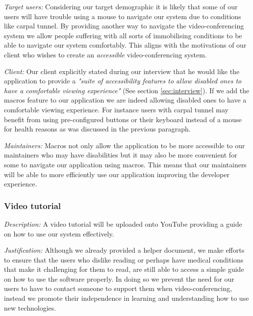 \textit{Target users:}
Considering our target demographic it is likely that
some of our users will have trouble using a mouse
to navigate our system due to conditions like carpal tunnel.
By providing another way to navigate the video-conferencing
system we allow people suffering with all sorts of
immobilising conditions to be able to navigate our system
comfortably. This aligns with the motivations of our client
who wishes to create an \textit{accessible} video-conferencing
system.
\\ \vspace{0.2cm}

\textit{Client:}
Our client explicitly stated during our interview
that he would like the application to provide a
\textit{"suite of accessibility features to allow
disabled ones to have a comfortable viewing
experience"} (See section \ref{sec:interview}). If we add
the macros feature to our application we are indeed allowing
disabled ones to have a comfortable viewing experience. For
instance users with carpal tunnel may benefit from using
pre-configured buttons or their keyboard instead of a mouse
for health reasons as was discussed in the previous paragraph.
\\ \vspace{0.2cm}

\textit{Maintainers:}
Macros not only allow the application to be more accessible
to our maintainers who may have disabilities but it may
also be more convenient for some to navigate our application
using macros. This means that our maintainers will be able
to more efficiently use our application improving the
developer experience.
\\ \vspace{0.2cm}

\subsubsection{Video tutorial}

\textit{Description:}
A video tutorial will be uploaded onto YouTube providing a
guide on how to use our system effectively. \\ \vspace{0.2cm}

\textit{Justification:}
Although we already provided a helper document, we make
efforts to ensure that the users who dislike reading or
perhaps have medical conditions that make it challenging for
them to read, are still able to access a simple guide on
how to use the software properly. In doing so we prevent the
need for our users to have to contact someone to support them
when video-conferencing, instead we promote their
independence in learning and understanding how to use new
technologies.

